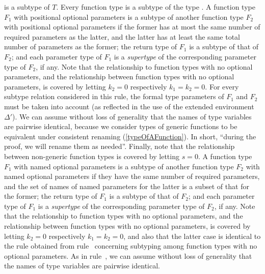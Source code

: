 \documentclass[makeidx]{article}
\begin{document}
{{\begin{itemize}
    is a subtype of $T$.
    Every function type is a subtype of the type \FUNCTION.
    A function type $F_1$ with positional optional parameters
    is a subtype of
    another function type $F_2$ with positional optional parameters
    if the former has at most
    the same number of required parameters as the latter,
    and the latter has at least
    the same total number of parameters as the former;
    the return type of $F_1$ is a subtype of that of $F_2$;
    and each parameter type of $F_1$ is a \emph{supertype} of
    the corresponding parameter type of $F_2$, if any.
    Note that the relationship to function types with no optional parameters,
    and the relationship between function types with no optional parameters,
    is covered by letting $k_2 = 0$ respectively $k_1 = k_2 = 0$.
    For every subtype relation considered in this rule,
    the formal type parameters of $F_1$ and $F_2$ must be taken into account
    (as reflected in the use of the extended environment $\Delta'$).
    We can assume without loss of generality
    that the names of type variables are pairwise identical,
    because we consider types of generic functions to be equivalent under
    consistent renaming
    (\ref{typeOfAFunction}).
    In short, ``during the proof, we will rename them as needed''.
    Finally, note that the relationship between non-generic function types
    is covered by letting $s = 0$.
    A function type $F_1$ with named optional parameters is a subtype of
    another function type $F_2$ with named optional parameters
    if they have the same number of required parameters,
    and the set of names of named parameters for the latter is a subset
    of that for the former;
    the return type of $F_1$ is a subtype of that of $F_2$;
    and each parameter type of $F_1$ is a \emph{supertype} of
    the corresponding parameter type of $F_2$, if any.
    Note that the relationship to function types with no optional parameters,
    and the relationship between function types with no optional parameters,
    is covered by letting $k_2 = 0$ respectively $k_1 = k_2 = 0$,
    and also that the latter case is identical to the rule obtained from
    rule~\SrnPositionalFunctionType{}
    concerning subtyping among function types with no optional parameters.
    As in rule~\SrnPositionalFunctionType,
    we can assume without loss of generality
    that the names of type variables are pairwise identical.

\end{itemize}}}
\end{document}
